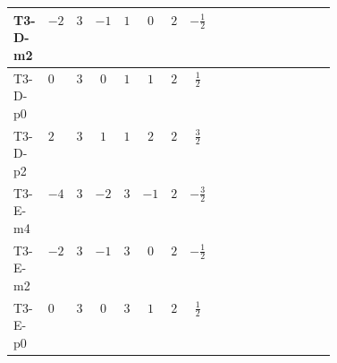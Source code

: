\documentclass[8pt]{article}
\begin{document}
\begin{landscape}
\begin{longtable}{@{}llcccccc >{\raggedright\arraybackslash}p{0.21\linewidth} >{\raggedright\arraybackslash}p{0.21\linewidth}@{}}
\midrule
T3-D-m2 & $-2$ & $3$ & $-1$ & $1$ & $0$ & $2$ & $-\frac{1}{2}$ & \scriptsize\adjustbox{max width=\linewidth}{$\begin{gathered} 6 C_{5} Y_d Y_d^\dagger\end{gathered}$} & \scriptsize\adjustbox{max width=\linewidth}{$\begin{gathered} 6 C_{5} Y_u Y_u^\dagger\end{gathered}$} \\
\midrule
T3-D-p0 & $0$ & $3$ & $0$ & $1$ & $1$ & $2$ & $\frac{1}{2}$ & \scriptsize\adjustbox{max width=\linewidth}{$\begin{gathered} 6 C_{5} Y_d Y_d^\dagger\end{gathered}$} & \scriptsize\adjustbox{max width=\linewidth}{$\begin{gathered} 6 C_{5} Y_u Y_u^\dagger\end{gathered}$} \\
\midrule
T3-D-p2 & $2$ & $3$ & $1$ & $1$ & $2$ & $2$ & $\frac{3}{2}$ & \scriptsize\adjustbox{max width=\linewidth}{$\begin{gathered} 6 C_{5} Y_d Y_d^\dagger\end{gathered}$} & \scriptsize\adjustbox{max width=\linewidth}{$\begin{gathered} 6 C_{5} Y_u Y_u^\dagger\end{gathered}$} \\
\midrule
T3-E-m4 & $-4$ & $3$ & $-2$ & $3$ & $-1$ & $2$ & $-\frac{3}{2}$ & \scriptsize\adjustbox{max width=\linewidth}{$\begin{gathered} 6 C_{5} Y_d Y_d^\dagger\end{gathered}$} & \scriptsize\adjustbox{max width=\linewidth}{$\begin{gathered} 6 C_{5} Y_u Y_u^\dagger\end{gathered}$} \\
\midrule
T3-E-m2 & $-2$ & $3$ & $-1$ & $3$ & $0$ & $2$ & $-\frac{1}{2}$ & \scriptsize\adjustbox{max width=\linewidth}{$\begin{gathered} 6 C_{5} Y_d Y_d^\dagger\end{gathered}$} & \scriptsize\adjustbox{max width=\linewidth}{$\begin{gathered} 6 C_{5} Y_u Y_u^\dagger\end{gathered}$} \\
\midrule
T3-E-p0 & $0$ & $3$ & $0$ & $3$ & $1$ & $2$ & $\frac{1}{2}$ & \scriptsize\adjustbox{max width=\linewidth}{$\begin{gathered} 6 C_{5} Y_d Y_d^\dagger\end{gathered}$} & \scriptsize\adjustbox{max width=\linewidth}{$\begin{gathered} 6 C_{5} Y_u Y_u^\dagger\end{gathered}$} \\

\end{longtable}
\end{landscape}
\end{document}
